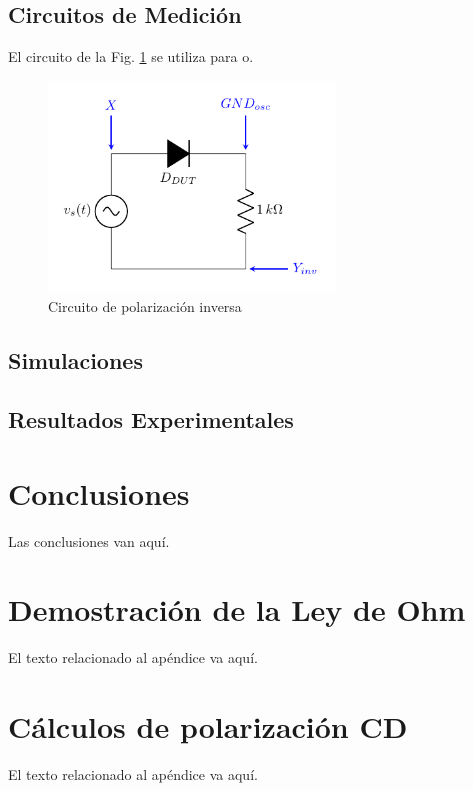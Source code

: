 \documentclass[journal]{IEEEtran}
\begin{document}
\subsection{Circuitos de Medición}
El circuito de la Fig. \ref{fig_cir2} se utiliza para o.

\begin{figure}[!ht]
\centering
\includegraphics[width=3in]{circuito_3}
\caption{Circuito de polarización inversa}
\label{fig_cir2}
\end{figure}

\subsection{Simulaciones}
\subsection{Resultados Experimentales}


\section{Conclusiones}
Las conclusiones van aquí.

\appendices
\section{Demostración de la Ley de Ohm}
El texto relacionado al apéndice va aquí.

\section{Cálculos de polarización CD}
El texto relacionado al apéndice va aquí.
\end{document}
